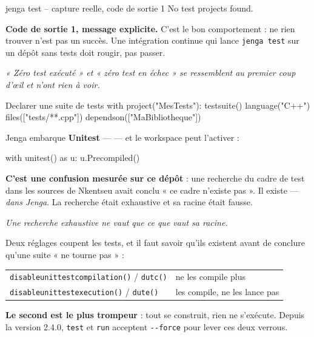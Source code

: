 \begin{nkcode}{jenga test -- capture reelle, code de sortie 1}
No test projects found.
\end{nkcode}

\begin{nkretenir}
\textbf{Code de sortie 1, message explicite.} C'est le bon comportement : ne rien
trouver n'est pas un succès. Une intégration continue qui lance \texttt{jenga
test} sur un dépôt sans tests doit rougir, pas passer.

\emph{« Zéro test exécuté » et « zéro test en échec » se ressemblent au premier
coup d'\oe il et n'ont rien à voir.}
\end{nkretenir}

\begin{nkcode}{Declarer une suite de tests}
with project("MesTests"):
    testsuite()
    language("C++")
    files(["tests/**.cpp"])
    dependson(["MaBibliotheque"])
\end{nkcode}

\begin{nkretenir}
Jenga embarque \textbf{Unitest} ---  --- et le workspace
peut l'activer :

\begin{nkcode}{}
with unitest() as u:
    u.Precompiled()
\end{nkcode}

\alerte{} \textbf{C'est une confusion mesurée sur ce dépôt} : une recherche du cadre de
test dans les sources de Nkentseu avait conclu « ce cadre n'existe pas ». Il
existe --- \emph{dans Jenga}. La recherche était exhaustive et sa racine était
fausse.

\emph{Une recherche exhaustive ne vaut que ce que vaut sa racine.}
\end{nkretenir}

\begin{nkretenir}
Deux réglages coupent les tests, et il faut savoir qu'ils existent avant de
conclure qu'une suite « ne tourne pas » :

\begin{center}
\begin{tabular}{@{}ll@{}}
\toprule
\texttt{disableunittestcompilation()} / \texttt{dutc()} & ne les compile plus \\
\texttt{disableunittestexecution()} / \texttt{dute()} & les compile, ne les lance pas \\
\bottomrule
\end{tabular}
\end{center}

\textbf{Le second est le plus trompeur} : tout se construit, rien ne s'exécute.
Depuis la version 2.4.0, \texttt{test} et \texttt{run} acceptent
\texttt{-{}-force} pour lever ces deux verrous.
\end{nkretenir}

